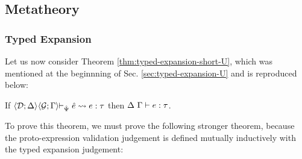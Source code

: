 



\subsection{Metatheory}\label{sec:SE-metatheory}
\subsubsection{Typed Expansion}
Let us now consider Theorem \ref{thm:typed-expansion-short-U}, which was mentioned at the beginnning of Sec. \ref{sec:typed-expansion-U} and is reproduced below:
\begingroup
\def\thetheorem{\ref{thm:typed-expansion-short-U}}
\begin{theorem} \hspace{-3px}If $\expandsU{\uDD{\uD}{\Delta}\hspace{-3px}}{\uGG{\uG}{\Gamma}\hspace{-3px}}{\uPsi}{\ue}{e}{\tau}$ then $\Delta~\Gamma \vdash e : \tau$.
\end{theorem}
\endgroup

 To prove this theorem, we must  prove the following stronger theorem, because the proto-expression validation judgement is defined mutually inductively with the typed expansion judgement:

